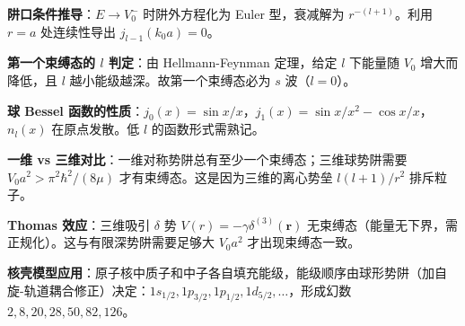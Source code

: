 \begin{drillbox}[训练点与考法变体]
 \textbf{阱口条件推导}：$E\to V_0^-$ 时阱外方程化为 Euler 型，衰减解为 $r^{-(l+1)}$。利用 $r=a$ 处连续性导出 $j_{l-1}(k_0a)=0$。

 \textbf{第一个束缚态的 $l$ 判定}：由 Hellmann-Feynman 定理，给定 $l$ 下能量随 $V_0$ 增大而降低，且 $l$ 越小能级越深。故第一个束缚态必为 $s$ 波（$l=0$）。

 \textbf{球 Bessel 函数的性质}：$j_0(x)=\sin x/x$，$j_1(x)=\sin x/x^2-\cos x/x$，$n_l(x)$ 在原点发散。低 $l$ 的函数形式需熟记。

 \textbf{一维 vs 三维对比}：一维对称势阱总有至少一个束缚态；三维球势阱需要 $V_0a^2>\pi^2\hbar^2/(8\mu)$ 才有束缚态。这是因为三维的离心势垒 $l(l+1)/r^2$ 排斥粒子。

 \textbf{Thomas 效应}：三维吸引 $\delta$ 势 $V(r)=-\gamma\delta^{(3)}(\mathbf{r})$ 无束缚态（能量无下界，需正规化）。这与有限深势阱需要足够大 $V_0a^2$ 才出现束缚态一致。

 \textbf{核壳模型应用}：原子核中质子和中子各自填充能级，能级顺序由球形势阱（加自旋-轨道耦合修正）决定：$1s_{1/2},1p_{3/2},1p_{1/2},1d_{5/2},\ldots$，形成幻数 $2,8,20,28,50,82,126$。
\end{drillbox}

